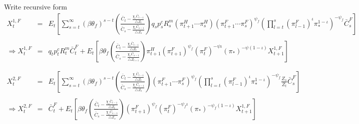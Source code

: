 \documentclass[11pt, a4paper]{article}
\begin{document}
  Write recursive form 
\begin{eqnarray*}  X_t^{1,F}&=&E_t \left[  \sum_{s=t}^{\infty}  (\beta\theta_f)^{s-t}  \left(\frac{\bar{C}_t - \frac{\chi_c\bar{C}_{t-1}}{\bigtriangleup Z_t}}{\bar{C}_s -  \frac{\chi_c\bar{C}_{s-1}}  {\bigtriangleup Z_s}}\right) q_s {p_s^c}R_s^m  (\pi_{t+1}^H \cdots \pi_{s}^H ) (\pi_{t+1}^F \cdots \pi_s^F)^{\psi_f} \left(  {\prod_{l=t}^s {(\pi_{l-1}^F)}^\iota \pi_*^{1-\iota} } \right)^{-\psi_f}\bar{C}_s^F\right] \\~\\
 \Rightarrow X_t^{1,F}&=&q_t p_t^c R_t^m  \bar{C}_t^F + E_t \left[\beta\theta_f \left(\frac{\bar{C}_t - \frac{\chi_c\bar{C}_{t-1}}{\bigtriangleup Z_t}}{\bar{C}_s -  \frac{\chi_c\bar{C}_{s-1}}  {\bigtriangleup Z_{t+1}}}\right) \pi_{t+1}^H {(\pi_{t+1}^F)}^{\psi_f} {(\pi_t^F)}^{-\psi\iota} (\pi_*)^{{-\psi}(1-\iota) }  X_{t+1}^{1,F} \right] \\~\\~\\ 
X_t^{2,F}&=&E_t \left[  \sum_{s=t}^{\infty}  (\beta\theta_f)^{s-t}  \left(\frac{\bar{C}_t - \frac{\chi_c\bar{C}_{t-1}}{\bigtriangleup Z_t}}{\bar{C}_s -  \frac{\chi_c\bar{C}_{s-1}}  {\bigtriangleup Z_s}}\right) (\pi_{t+1}^F \cdots \pi_s^F)^{\psi_f} \left(  {\prod_{l=t}^s {(\pi_{l-1}^F)}^\iota \pi_*^{1-\iota} } \right)^{-\psi_f}\frac{Z_s}{Z_t}\bar{C}_s^F\right] \\~\\
 \Rightarrow X_t^{2,F} &=&  \bar{C}_t^F + E_t \left[\beta\theta_f \left(\frac{\bar{C}_t - \frac{\chi_c\bar{C}_{t-1}}{\bigtriangleup Z_t}}{\bar{C}_s -  \frac{\chi_c\bar{C}_{s-1}}  {\bigtriangleup Z_s}}\right) {(\pi_{t+1}^F)}^{\psi_f} {(\pi_t^F)}^{-\psi_f\iota} (\pi_*)^{{-\psi_f}(1-\iota) }  X_{t+1}^{1,F} \right] \\~\\ 
\end{eqnarray*} \\



\end{document}
